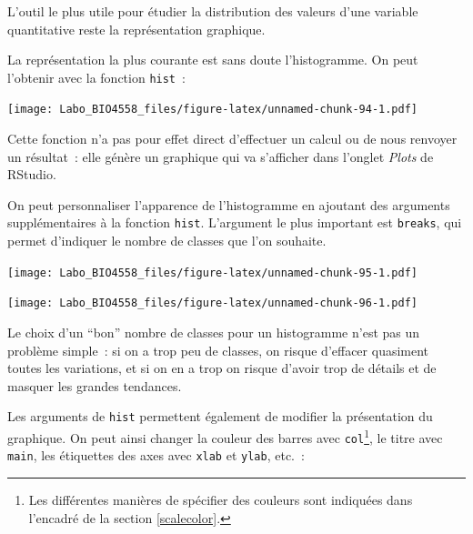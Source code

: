 \documentclass[12pt,]{book}
\newenvironment{Shaded}{\begin{snugshade}}{\end{snugshade}}
\newcommand{\DataTypeTok}[1]{\textcolor[rgb]{0.27,0.27,0.27}{#1}}
\newcommand{\DecValTok}[1]{\textcolor[rgb]{0.06,0.06,0.06}{#1}}
\newcommand{\KeywordTok}[1]{\textcolor[rgb]{0.27,0.27,0.27}{\textbf{#1}}}
\newcommand{\NormalTok}[1]{#1}
\newcommand{\OperatorTok}[1]{\textcolor[rgb]{0.43,0.43,0.43}{\textbf{#1}}}
\begin{document}
L'outil le plus utile pour étudier la distribution des valeurs d'une variable quantitative reste la représentation graphique.

La représentation la plus courante est sans doute l'histogramme. On peut l'obtenir avec la fonction \texttt{hist}~:

\begin{Shaded}
\end{Shaded}

\texttt{[image: Labo\_BIO4558\_files/figure-latex/unnamed-chunk-94-1.pdf]}

Cette fonction n'a pas pour effet direct d'effectuer un calcul ou de nous renvoyer un résultat~: elle génère un graphique qui va s'afficher dans l'onglet \emph{Plots} de RStudio.

On peut personnaliser l'apparence de l'histogramme en ajoutant des arguments supplémentaires à la fonction \texttt{hist}. L'argument le plus important est \texttt{breaks}, qui permet d'indiquer le nombre de classes que l'on souhaite.

\begin{Shaded}
\end{Shaded}

\texttt{[image: Labo\_BIO4558\_files/figure-latex/unnamed-chunk-95-1.pdf]}

\begin{Shaded}
\end{Shaded}

\texttt{[image: Labo\_BIO4558\_files/figure-latex/unnamed-chunk-96-1.pdf]}

Le choix d'un ``bon'' nombre de classes pour un histogramme n'est pas un problème simple~: si on a trop peu de classes, on risque d'effacer quasiment toutes les variations, et si on en a trop on risque d'avoir trop de détails et de masquer les grandes tendances.

Les arguments de \texttt{hist} permettent également de modifier la présentation du graphique. On peut ainsi changer la couleur des barres avec \texttt{col}\footnote{Les différentes manières de spécifier des couleurs sont indiquées dans l'encadré de la section \ref{scalecolor}.}, le titre avec \texttt{main}, les étiquettes des axes avec \texttt{xlab} et \texttt{ylab}, etc.~:
\end{document}
